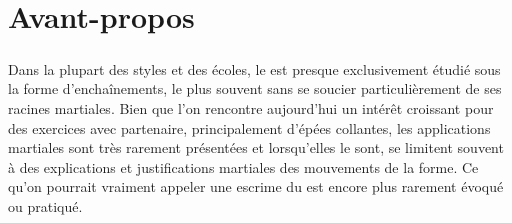 \chapter{Avant-propos}\label{avant-propos}

\paragraph*{}
Dans la plupart des styles et des écoles, le \Taijijian{} est presque exclusivement étudié sous la forme d'enchaînements, le plus souvent sans se soucier particulièrement de ses racines martiales.
Bien que l'on rencontre aujourd'hui un intérêt croissant pour des exercices avec partenaire, principalement d'épées collantes, les applications martiales sont très rarement présentées et lorsqu'elles le sont, se limitent souvent à des explications et justifications martiales des mouvements de la forme.
Ce qu'on pourrait vraiment appeler une escrime du \Taijijian{} est encore plus rarement évoqué ou pratiqué.

